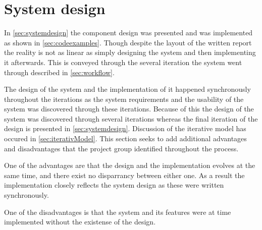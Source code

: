 \section{System design}

In \cref{sec:systemdesign} the component design was presented and was implemented as shown in \cref{sec:codeexamples}.
Though despite the layout of the written report the reality is not as linear as simply designing the system and then implementing it afterwards.
This is conveyed through the several iteration the system went through described in \cref{sec:workflow}.

The design of the system and the implementation of it happened synchronously throughout the iterations as the system requirements and the usability of the system was discovered through these iterations.
Because of this the design of the system was discovered through several iterations whereas the final iteration of the design is presented in \cref{sec:systemdesign}.
Discussion of the iterative model has occured in \cref{sec:iterativModel}.
This section seeks to add additional advantages and disadvantages that the project group identified throughout the process.

One of the advantages are that the design and the implementation evolves at the same time, and there exist no disparrancy between either one.
As a result the implementation closely reflects the system design as these were written synchronously.

One of the disadvantages is that the system and its features were at time implemented without the existense of the design.
